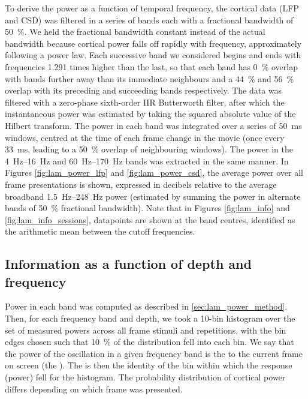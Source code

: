 To derive the power as a function of temporal frequency, the cortical data (\ac{LFP} and \ac{CSD}) was filtered in a series of bands each with a fractional bandwidth of \SI{50}{\percent}.
We held the fractional bandwidth constant instead of the actual bandwidth because cortical power falls off rapidly with frequency, approximately following a power law.
Each successive band we considered begins and ends with frequencies \num{1.291} times higher than the last, so that each band has \SI{0}{\percent} overlap with bands further away than its immediate neighbours and a \SI{44}{\percent} and \SI{56}{\percent} overlap with its preceding and succeeding bands respectively.
The data was filtered with a zero-phase sixth-order \ac{IIR} Butterworth filter, after which the instantaneous power was estimated by taking the squared absolute value of the Hilbert transform.
The power in each band was integrated over a series of \SI{50}{\milli\second} windows, centred at the time of each frame change in the movie (once every \SI{33}{\milli\second}, leading to a \SI{50}{\percent} overlap of neighbouring windows).
The power in the \SIrange{4}{16}{Hz} and \SIrange{60}{170}{Hz} bands was extracted in the same manner.
In Figures \ref{fig:lam_power_lfp} and \ref{fig:lam_power_csd}, the average power over all frame presentations is shown, expressed in decibels relative to the average broadband \SIrange{1.5}{248}{Hz} power (estimated by summing the power in alternate bands of \SI{50}{\percent} fractional bandwidth).
Note that in Figures \ref{fig:lam_info} and \ref{fig:lam_info_sessions}, datapoints are shown at the band centres, identified as the arithmetic mean between the cutoff frequencies.


\subsection{Information as a function of depth and frequency}
\label{sec:lam_info_method}

Power in each band was computed as described in \autoref{sec:lam_power_method}.
Then, for each frequency band and depth, we took a \num{10}-bin histogram over the set of measured powers across all frame stimuli and repetitions, with the bin edges chosen such that \SI{10}{\percent} of the distribution fell into each bin.
We say that the power of the oscillation in a given frequency band is the  to the current frame on screen (the ).
The  is then the identity of the bin within which the response (power) fell for the histogram.
The probability distribution of cortical power differs depending on which frame was presented.

